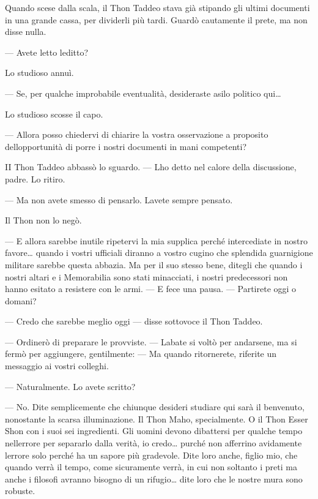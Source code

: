 Quando scese dalla scala, il Thon Taddeo stava già stipando gli ultimi
documenti in una grande cassa, per dividerli più tardi. Guardò
cautamente il prete, ma non disse nulla.

--- Avete letto l\textquotesingle editto?

Lo studioso annuì.

--- Se, per qualche improbabile eventualità, desideraste asilo politico
qui\ldots{}

Lo studioso scosse il capo.

--- Allora posso chiedervi di chiarire la vostra osservazione a
proposito dell\textquotesingle opportunità di porre i nostri documenti
in mani competenti?

II Thon Taddeo abbassò lo sguardo. --- L\textquotesingle ho detto nel
calore della discussione, padre. Lo ritiro.

--- Ma non avete smesso di pensarlo. L\textquotesingle avete sempre
pensato.

Il Thon non lo negò.

--- E allora sarebbe inutile ripetervi la mia supplica perché
intercediate in nostro favore\ldots{} quando i vostri ufficiali diranno
a vostro cugino che splendida guarnigione militare sarebbe questa
abbazia. Ma per il suo stesso bene, ditegli che quando i nostri altari e
i Memorabilia sono stati minacciati, i nostri predecessori non hanno
esitato a resistere con le armi. --- E fece una pausa. --- Partirete
oggi o domani?

--- Credo che sarebbe meglio oggi --- disse sottovoce il Thon Taddeo.

--- Ordinerò di preparare le provviste. --- L\textquotesingle abate si
voltò per andarsene, ma si fermò per aggiungere, gentilmente: --- Ma
quando ritornerete, riferite un messaggio ai vostri colleghi.

--- Naturalmente. Lo avete scritto?

--- No. Dite semplicemente che chiunque desideri studiare qui sarà il
benvenuto, nonostante la scarsa illuminazione. Il Thon Maho,
specialmente. O il Thon Esser Shon con i suoi sei ingredienti. Gli
uomini devono dibattersi per qualche tempo nell\textquotesingle errore
per separarlo dalla verità, io credo\ldots{} purché non afferrino
avidamente l\textquotesingle errore solo perché ha un sapore più
gradevole. Dite loro anche, figlio mio, che quando verrà il tempo, come
sicuramente verrà, in cui non soltanto i preti ma anche i filosofi
avranno bisogno di un rifugio\ldots{} dite loro che le nostre mura sono
robuste.

